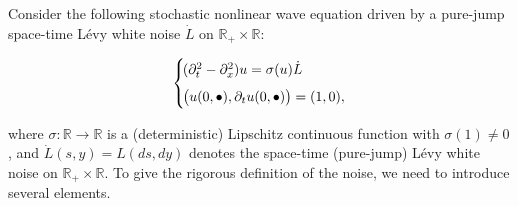 \documentclass[letterpaper, 11pt,  reqno]{amsart}
\newcommand{\noi}{\noindent}
\newcommand{\R}{\mathbb{R}}
\newcommand{\bul}{\bullet}
\newcommand{\s}{\sigma}
\newcommand{\dx}{\partial_x}
\newcommand{\dt}{\partial_t}
\numberwithin{equation}{section}
\numberwithin{theorem}{section}
\begin{document}
Consider
the following stochastic  nonlinear  wave equation driven
by a pure-jump space-time L\'evy white noise $\dot{L}$
on $\R_+\times\R$:


\noi
\begin{align}
\begin{cases}
 & \hspace{-4mm} ( \dt^2 - \dx^2) u   = \s(u) \dot{L} \\[0.5em]
&  \hspace{-4mm}  \big( u(0, \bul), \dt u(0, \bullet) \big) = (1, 0),
\end{cases}
\label{SWE}
\end{align}

\noi
where $\s: \R\to\R$ is a (deterministic) Lipschitz continuous function with $\s(1) \neq 0$,
and  $\dot{L}(s, y) = L(ds, dy)$ denotes the  space-time (pure-jump) L\'evy white 
noise on $\R_+\times\R$. To give the rigorous definition of the noise, we need to introduce several elements.
\end{document}
